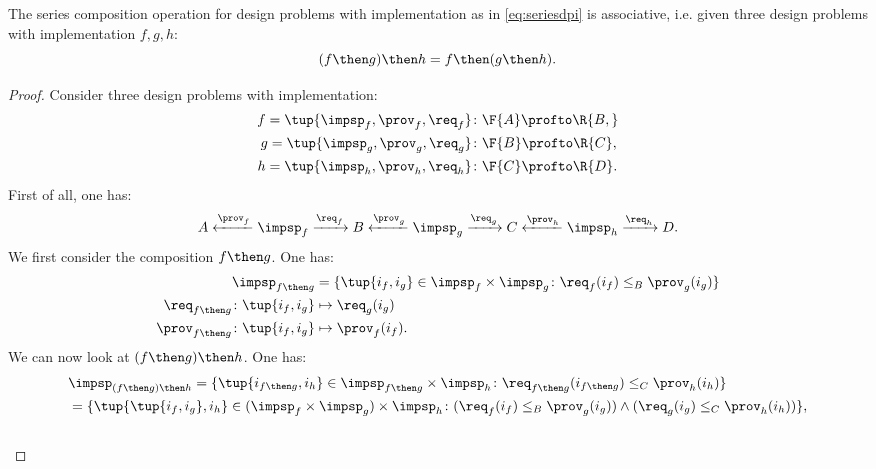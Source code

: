 \begin{lemma}
The series composition operation for design problems with implementation as in \cref{eq:seriesdpi} is associative, i.e. given three design problems with implementation $f,g,h$:
\begin{equation}
(f\then g)\then h = f\then (g\then h).
\end{equation}
\end{lemma}
\begin{proof}
Consider three design problems with implementation:
\begin{equation}
\begin{aligned}
f=\tup{{\impsp_f, \prov_f, \req_f} }&\colon \F{A} \profto\R{B,}\\
g=\tup{\impsp_g, \prov_g, \req_g}&\colon \F{B} \profto \R{C},\\
h=\tup{\impsp_h, \prov_h, \req_h}&\colon \F{C} \profto \R{D}.
\end{aligned}
\end{equation}
First of all, one has:
\begin{equation}
A \xleftarrow{\prov_f} \impsp_f \xrightarrow{\req_f} B
\xleftarrow{\prov_g} \impsp_g \xrightarrow{\req_g} C
\xleftarrow{\prov_h} \impsp_h \xrightarrow{\req_h} D.
\end{equation}
We first consider the composition $f\then g$. One has:
\begin{equation}
\begin{aligned}
\impsp_{f\then g} &= \{
\tup{i_f,i_g} \in \impsp_f \times \impsp_g \colon
\req_f(i_f) \leq_{B} \prov_g(i_g)
\}\\
\req_{f\then g}  \colon  \tup{i_f,i_g} &\mapsto \req_g(i_g) \\
\prov_{f\then g}  \colon  \tup{i_f,i_g} &\mapsto \prov_f(i_f).
\end{aligned}
\end{equation}
We can now look at $(f\then g)\then h$. One has:
\begin{equation}
\begin{aligned}
&\impsp_{(f\then g)\then h} = \{
\tup{i_{f\then g},i_h} \in \impsp_{f\then g} \times \impsp_{h}\colon
\req_{f\then g}(i_{f\then g}) \leq_{C} \prov_h(i_h)
\}\\
&=\{
\tup{\tup{i_f, i_g},i_h} \in (\impsp_f \times \impsp_g) \times \impsp_{h}\colon
(\req_f(i_f) \leq_{B} \prov_g(i_g))
\wedge
(\req_g(i_g) \leq_{C} \prov_h(i_h))
\},
\end{aligned}
\end{equation}
~
\begin{equation}

\end{equation}
\end{proof}
